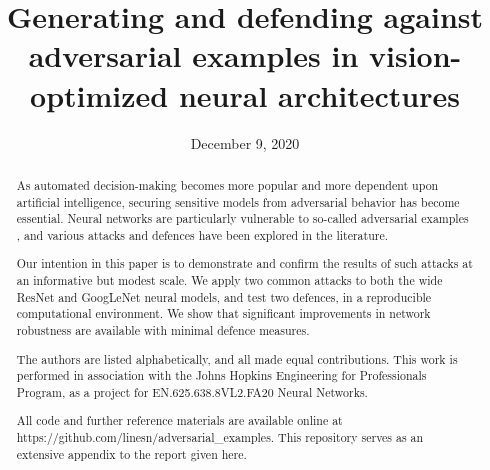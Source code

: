 \documentclass[conference]{IEEEtran}
\begin{document}
\title{Generating and defending against adversarial examples in
vision-optimized neural architectures}
\specialpapernotice{}
\date{December 9, 2020}

\author{
\and
{}
\and
{}
}%

\maketitle%

\begin{abstract}%

As automated decision-making becomes more popular and more dependent upon
artificial intelligence, securing sensitive models from adversarial behavior
has become essential. Neural networks are particularly vulnerable to
so-called adversarial examples \cite{szegedy2014intriguing}, and various
attacks and defences have been explored in the literature.

Our intention in this paper is to demonstrate and confirm the results of
such attacks at an informative but modest scale. We apply two common attacks
to both the wide ResNet and GoogLeNet neural models, and test two defences,
in a reproducible computational environment. We show that significant
improvements in network robustness are available with minimal defence
measures.

The authors are listed alphabetically, and all made equal contributions.
This work is performed in association with the Johns Hopkins Engineering for
Professionals Program, as a project for EN.625.638.8VL2.FA20 Neural Networks.

All code and further reference materials are available online at
https://github.com/linesn/adversarial\_examples. This repository serves as
an extensive appendix to the report given here.

\end{abstract}%
\end{document}
